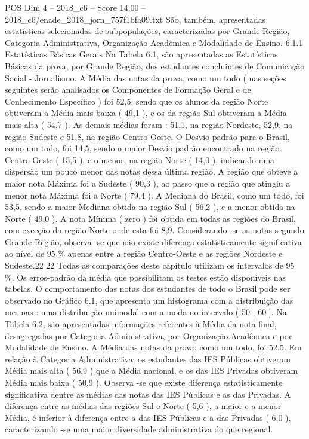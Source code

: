 \begin{textsample}{POS Dim 4 – 2018\_c6 – Score 14.00 – 2018\_c6/enade\_2018\_jorn\_757f1bfa09.txt}
São, também, apresentadas estatísticas selecionadas de subpopulações, caracterizadas por Grande Região, Categoria Administrativa, Organização Acadêmica e Modalidade de Ensino. 6.1.1 Estatísticas Básicas Gerais Na Tabela 6.1, são apresentadas as Estatísticas Básicas da prova, por Grande Região, dos estudantes concluintes de Comunicação Social - Jornalismo.
A Média das notas da prova, como um todo ( nas seções seguintes serão analisados os Componentes de Formação Geral e de Conhecimento Específico ) foi 52,5, sendo que os alunos da região Norte obtiveram a Média mais baixa ( 49,1 ), e os da região Sul obtiveram a Média mais alta ( 54,7 ).
As demais médias foram : 51,1, na região Nordeste, 52,9, na região Sudeste e 51,8, na região Centro-Oeste.
O Desvio padrão para o Brasil, como um todo, foi 14,5, sendo o maior Desvio padrão encontrado na região Centro-Oeste ( 15,5 ), e o menor, na região Norte ( 14,0 ), indicando uma dispersão um pouco menor das notas dessa última região.
A região que obteve a maior nota Máxima foi a Sudeste ( 90,3 ), ao passo que a região que atingiu a menor nota Máxima foi a Norte ( 79,4 ).
A Mediana do Brasil, como um todo, foi 53,5, sendo a maior Mediana obtida na região Sul ( 56,2 ), e a menor obtida na Norte ( 49,0 ).
A nota Mínima ( zero ) foi obtida em todas as regiões do Brasil, com exceção da região Norte onde esta foi 8,9.
Considerando -se as notas segundo Grande Região, observa -se que não existe diferença estatisticamente significativa ao nível de 95 \% apenas entre a região Centro-Oeste e as regiões Nordeste e Sudeste.22 22 Todas as comparações deste capítulo utilizam os intervalos de 95 \%.
Os erros-padrão da média que possibilitam os testes estão disponíveis nas tabelas.
O comportamento das notas dos estudantes de todo o Brasil pode ser observado no Gráfico 6.1, que apresenta um histograma com a distribuição das mesmas : uma distribuição unimodal com a moda no intervalo ( 50 ; 60 ].
Na Tabela 6.2, são apresentadas informações referentes à Média da nota final, desagregadas por Categoria Administrativa, por Organização Acadêmica e por Modalidade de Ensino.
A Média das notas da prova, como um todo, foi 52,5.
Em relação à Categoria Administrativa, os estudantes das IES Públicas obtiveram Média mais alta ( 56,9 ) que a Média nacional, e os das IES Privadas obtiveram Média mais baixa ( 50,9 ).
Observa -se que existe diferença estatisticamente significativa dentre as médias das notas das IES Públicas e as das Privadas.
A diferença entre as médias das regiões Sul e Norte ( 5,6 ), a maior e a menor Média, é inferior à diferença entre a das IES Públicas e a das Privadas ( 6,0 ), caracterizando -se uma maior diversidade administrativa do que regional.

\end{textsample}
